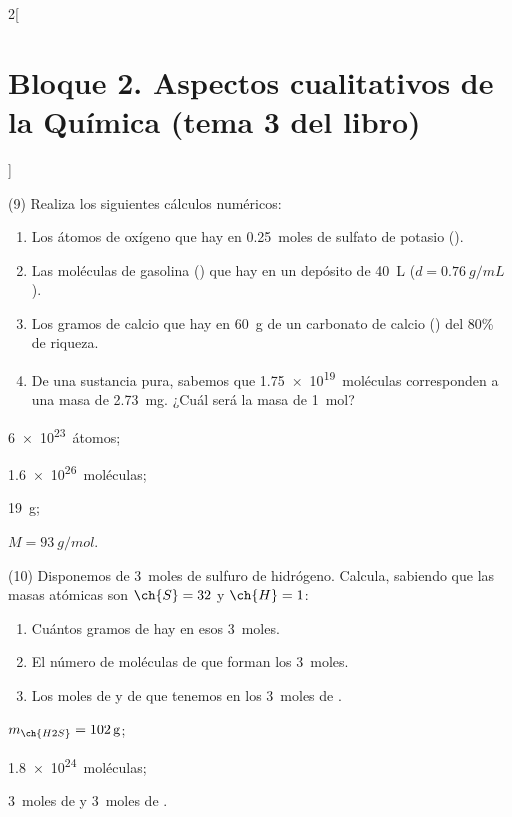 \documentclass[10pt]{article}
\begin{document}
\begin{multicols}{2}[
    \section{Bloque 2. Aspectos cualitativos de la Química (tema 3 del libro)}
  ]
\begin{exercise}[
    tags    = {},
    topics  = {química,química básica},
    source  = {FQ 1B MGH 2016, p83, e9},
  ]
  (9) Realiza los siguientes cálculos numéricos:
  \begin{enumerate}
    \item Los átomos de oxígeno que hay en \SI{0.25}{moles} de sulfato de potasio ().
    \item Las moléculas de gasolina () que hay en un depósito de \SI{40}{\liter} (\( d = \SI{0.76}{g/mL} \)).
    \item Los gramos de calcio que hay en \SI{60}{g} de un carbonato de calcio () del 80\% de riqueza.
    \item De una sustancia pura, sabemos que \SI{1.75e19}{moléculas} corresponden a una masa de \SI{2.73}{mg}. ¿Cuál será la masa de \SI{1}{mol}?
  \end{enumerate}
\end{exercise}

\begin{solution}
  \begin{enumerate*}
    \item \SI{6e23}{átomos}; \item \SI{1.6e26}{moléculas}; \item \SI{19}{g}; \item \( M = \SI{93}{g/mol} \).
  \end{enumerate*}
\end{solution}




\begin{exercise}[
    tags    = {},
    topics  = {química,química básica},
    source  = {FQ 1B MGH 2016, p83, e10},
  ]
  (10) Disponemos de \SI{3}{moles} de sulfuro de hidrógeno. Calcula,
  sabiendo que las masas atómicas son \( \ch{S} = 32 \) y \( \ch{H} = 1 \):
  \begin{enumerate}
    \item Cuántos gramos de  hay en esos \SI{3}{moles}.
    \item El número de moléculas de  que forman los \SI{3}{moles}.
    \item Los moles de  y de  que tenemos en los \SI{3}{moles} de .
  \end{enumerate}
\end{exercise}

\begin{solution}
  \begin{enumerate*}
    \item \( m_{\ch{H2S}} = \SI{102}{\gram} \);
    \item \SI{1.8e24}{moléculas};
    \item \SI{3}{moles} de  y \SI{3}{moles} de .
  \end{enumerate*}
\end{solution}





\end{multicols}
\end{document}
